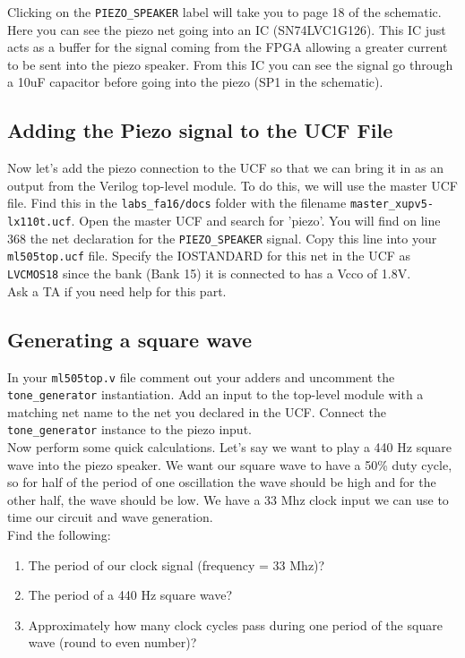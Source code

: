 \documentclass[11pt]{article}
\begin{document}
Clicking on the \verb|PIEZO_SPEAKER| label will take you to page 18 of the schematic. Here you can see the piezo net going into an IC (SN74LVC1G126). This IC just acts as a buffer for the signal coming from the FPGA allowing a greater current to be sent into the piezo speaker. From this IC you can see the signal go through a 10uF capacitor before going into the piezo (SP1 in the schematic).

\subsection{Adding the Piezo signal to the UCF File}
Now let's add the piezo connection to the UCF so that we can bring it in as an output from the Verilog top-level module. To do this, we will use the master UCF file. Find this in the \verb|labs_fa16/docs| folder with the filename \verb|master_xupv5-lx110t.ucf|. Open the master UCF and search for 'piezo'. You will find on line 368 the net declaration for the \verb|PIEZO_SPEAKER| signal. Copy this line into your \verb|ml505top.ucf| file. Specify the IOSTANDARD for this net in the UCF as \verb|LVCMOS18| since the bank (Bank 15) it is connected to has a Vcco of 1.8V.\\

Ask a TA if you need help for this part.

\subsection{Generating a square wave}
In your \verb|ml505top.v| file comment out your adders and uncomment the \verb|tone_generator| instantiation. Add an input to the top-level module with a matching net name to the net you declared in the UCF. Connect the \verb|tone_generator| instance to the piezo input.\\

Now perform some quick calculations. Let's say we want to play a 440 Hz square wave into the piezo speaker. We want our square wave to have a 50\% duty cycle, so for half of the period of one oscillation the wave should be high and for the other half, the wave should be low. We have a 33 Mhz clock input we can use to time our circuit and wave generation. \\

Find the following:
\begin{enumerate}
	\item The period of our clock signal (frequency = 33 Mhz)?
	\item The period of a 440 Hz square wave?
	\item Approximately how many clock cycles pass during one period of the square wave (round to even number)?
\end{enumerate}
\end{document}
